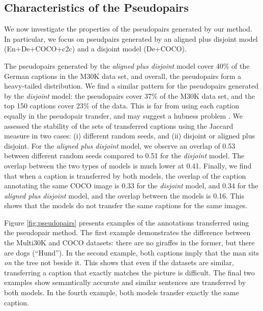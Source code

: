 \subsection{Characteristics of the Pseudopairs}


We now investigate the properties of the pseudopairs generated by our method. In particular, we focus on pseudpairs generated by an aligned plus disjoint model (En+De+COCO+c2c) and a disjoint model (De+COCO).

The pseudopairs generated by the \textit{aligned plus disjoint} model cover 40\% of the German captions in the M30K data set, and overall, the pseudopairs form a heavy-tailed distribution.
We find a similar pattern for the pseudopairs generated by the \textit{disjoint} model: the pseudopairs cover 37\% of the M30K data set, and the top 150 captions cover 23\% of the data. This is far from using each caption equally in the pseudopair transfer, and may suggest a hubness problem \citep{dinu2014improving}. We assessed the stability of the sets of transferred captions using the Jaccard measure in two cases: (i) different random seeds, and (ii) disjoint or aligned plus disjoint. For the \emph{aligned plus disjoint} model, we observe an overlap of 0.53 between different random seeds compared to 0.51 for the \emph{disjoint} model. The overlap between the two types of models is much lower at 0.41. Finally, we find that when a caption is transferred by both models, the overlap of the caption annotating the same COCO image is 0.33 for the \emph{disjoint} model, and 0.34 for the \emph{aligned plus disjoint} model, and the overlap between the models is 0.16. This shows that the models do not transfer the same captions for the same images.


Figure \ref{fig:pseudopairs} presents examples of the annotations transferred using the pseudopair method. The first example demonstrates the difference between the Multi30K and COCO datasets: there are no giraffes in the former, but there are dogs (``Hund'').  In the second example, both captions imply that the man sits \emph{on} the tree not beside it. This shows that even if the datasets are similar, transferring a caption that exactly matches the picture is difficult. The final two examples show semantically accurate and similar sentences are transferred by both models. In the fourth example, both models transfer exactly the same caption.




